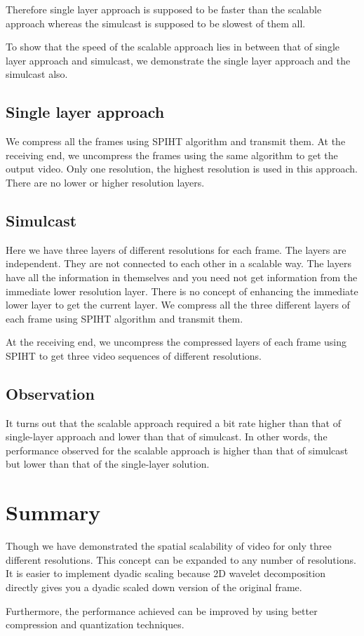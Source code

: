 \documentclass[10pt,twocolumn]{article}
\begin{document}
Therefore single layer approach is supposed to be faster than the scalable approach whereas the simulcast is supposed to be slowest of them all\cite{segall2007}.

To show that the speed of the scalable approach lies in between that of single layer approach and simulcast, we demonstrate the single layer approach and the simulcast also.

\subsection*{Single layer approach}
We compress all the frames using SPIHT algorithm and transmit them. At the receiving end, we uncompress the frames using the same algorithm to get the output video. Only one resolution, the highest resolution is used in this approach. There are no lower or higher resolution layers.

\subsection*{Simulcast}

Here we have three layers of different resolutions for each frame. The layers are independent. They are not connected to each other in a scalable way. The layers have all the information in themselves and you need not get information from the immediate lower resolution layer. There is no concept of enhancing the immediate lower layer to get the current layer. We compress all the three different layers of each frame using SPIHT algorithm and transmit them.

At the receiving end, we uncompress the compressed layers of each frame using SPIHT to get three video sequences of different resolutions.

\subsection*{Observation}
It turns out that the scalable approach required a bit rate higher than that of single-layer approach and lower than that of simulcast. In other words, the performance observed for the scalable approach is higher than that of simulcast but lower than that of the single-layer solution.

\section{Summary}

Though we have demonstrated the spatial scalability of video for only three different resolutions. This concept can be expanded to any number of resolutions. It is easier to implement dyadic scaling because 2D wavelet decomposition directly gives you a dyadic scaled down version of the original frame.

Furthermore, the performance achieved can be improved by using better compression and quantization techniques.



\end{document}

